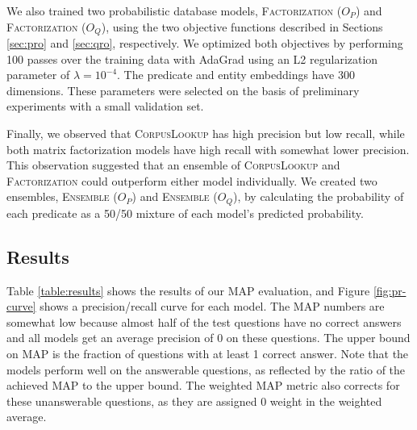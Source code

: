 \documentclass[11pt]{article}
\newcommand{\pred}[1]{\textsc{#1}}
\newcommand{\clb}{\textsc{CorpusLookup}}
\newcommand{\uspr}{\textsc{Factorization} (\ensuremath{O_P})}
\newcommand{\usqr}{\textsc{Factorization} (\ensuremath{O_Q})}
\newcommand{\epr}{\textsc{Ensemble} (\ensuremath{O_P})}
\newcommand{\eqr}{\textsc{Ensemble} (\ensuremath{O_Q})}
\begin{document}
We also trained two probabilistic database models, \uspr{} and
\usqr{}, using the two objective functions described in Sections
\ref{sec:pro} and \ref{sec:qro}, respectively. We optimized both
objectives by performing 100 passes over the training data with
AdaGrad \cite{duchi2011} using an L2 regularization parameter of
$\lambda=10^{-4}$. The predicate and entity embeddings have 300
dimensions. These parameters were selected on the basis of preliminary
experiments with a small validation set.

Finally, we observed that \clb{} has high precision but low recall,
while both matrix factorization models have high recall with somewhat
lower precision. This observation suggested that an ensemble of
\pred{CorpusLookup} and \pred{Factorization} could outperform either
model individually. We created two ensembles, \epr{} and \eqr{}, by
calculating the probability of each predicate as a 50/50 mixture of
each model's predicted probability.



\subsection{Results}

Table \ref{table:results} shows the results of our MAP evaluation, and
Figure \ref{fig:pr-curve} shows a precision/recall curve for each
model. The MAP numbers are somewhat low because almost half of the
test questions have no correct answers and all models get an average
precision of 0 on these questions. The upper bound on MAP is the
fraction of questions with at least 1 correct answer. Note that the
models perform well on the answerable questions, as reflected by the
ratio of the achieved MAP to the upper bound. The weighted MAP metric
also corrects for these unanswerable questions, as they are assigned 0
weight in the weighted average.
\end{document}
